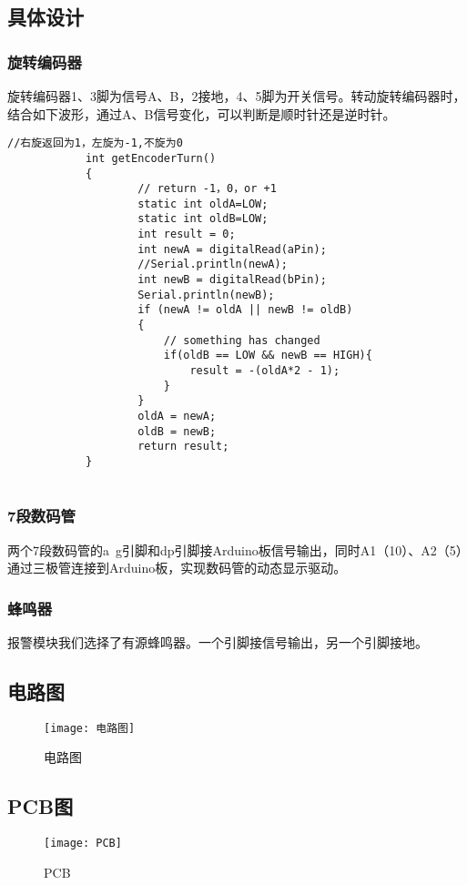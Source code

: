 \documentclass{../source/Experiment}
\begin{document}
        \subsection{具体设计}
            \subsubsection{旋转编码器}
            旋转编码器1、3脚为信号A、B，2接地，4、5脚为开关信号。转动旋转编码器时，结合如下波形，通过A、B信号变化，可以判断是顺时针还是逆时针。
            \begin{lstlisting}[name = 旋转编码器Arduino代码]
                //右旋返回为1，左旋为-1,不旋为0
            int getEncoderTurn()
            {
                    // return -1，0，or +1 
                    static int oldA=LOW; 
                    static int oldB=LOW; 
                    int result = 0;
                    int newA = digitalRead(aPin);
                    //Serial.println(newA);
                    int newB = digitalRead(bPin);
                    Serial.println(newB);
                    if (newA != oldA || newB != oldB)
                    {
                        // something has changed
                        if(oldB == LOW && newB == HIGH){
                            result = -(oldA*2 - 1);
                        }
                    }
                    oldA = newA;
                    oldB = newB;
                    return result;
            }
                        
                    \end{lstlisting}
            \subsubsection{7段数码管}
            两个7段数码管的a~g引脚和dp引脚接Arduino板信号输出，同时A1（10）、A2（5）通过三极管连接到Arduino板，实现数码管的动态显示驱动。

            \subsubsection{蜂鸣器}
            报警模块我们选择了有源蜂鸣器。一个引脚接信号输出，另一个引脚接地。

        \subsection{电路图}
            \begin{figure}[H]
                \centering
                \texttt{[image: 电路图]}
                \caption{电路图}
            \end{figure}
            
        \subsection{PCB图}
            \begin{figure}[H]
                \centering
                \texttt{[image: PCB]}
                \caption{PCB}
            \end{figure}
        
        
        
    
    
\end{document}
